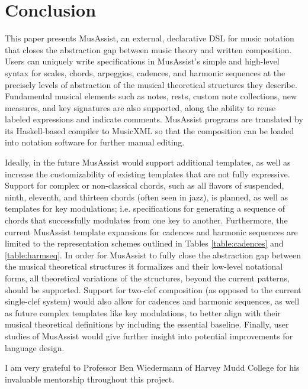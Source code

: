 \documentclass{article}
\begin{document}
\section{Conclusion}
This paper presents MusAssist, an external, declarative DSL for music notation that closes the abstraction gap between music theory and written composition. Users can uniquely write specifications in MusAssist's simple and high-level syntax for scales, chords, arpeggios, cadences, and harmonic sequences at the precisely levels of abstraction of the musical theoretical structures they describe. Fundamental musical elements such as notes, rests, custom note collections, new measures, and key signatures are also supported, along the ability to reuse labeled expressions and indicate comments. MusAssist programs are translated by its Haskell-based compiler to MusicXML so that the composition can be loaded into notation software for further manual editing. 


Ideally, in the future MusAssist would support additional templates, as well as increase the customizability of existing templates that are not fully expressive.  Support for complex or non-classical chords, such as all flavors of suspended, ninth, eleventh, and thirteen chords (often seen in jazz), is planned, as well as templates for key modulations; i.e. specifications for generating a sequence of chords that successfully modulates from one key to another. Furthermore, the current MusAssist template expansions for cadences and harmonic sequences are limited to the representation schemes outlined in Tables \ref{table:cadences} and \ref{table:harmseq}. In order for MusAssist to fully close the abstraction gap between the musical theoretical structures it formalizes and their low-level notational forms, all theoretical variations of the structures, beyond the current patterns, should be supported. Support for two-clef composition (as opposed to the current single-clef system) would also allow for cadences and harmonic sequences, as well as future complex templates like key modulations, to better align with their musical theoretical definitions by including the essential baseline. Finally, user studies of MusAssist would give further insight into potential improvements for language design. 

\begin{acknowledgments}
I am very grateful to Professor Ben Wiedermann of Harvey Mudd College for his invaluable mentorship throughout this project.
\end{acknowledgments} 


\end{document}
